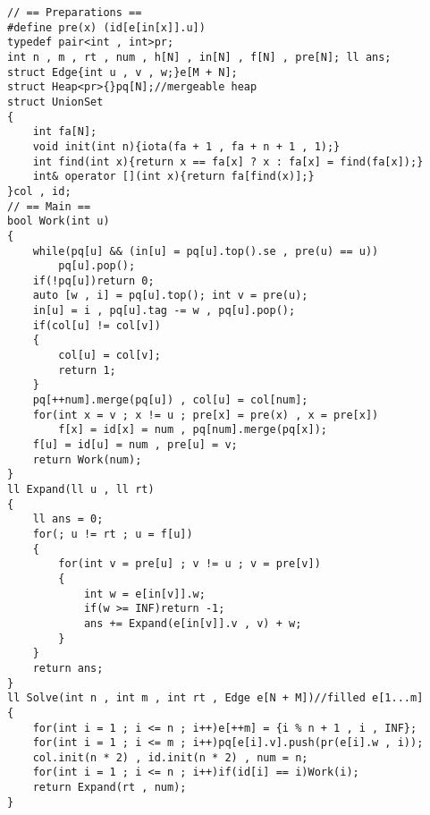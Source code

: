\begin{verbatim}
// == Preparations ==
#define pre(x) (id[e[in[x]].u])
typedef pair<int , int>pr;
int n , m , rt , num , h[N] , in[N] , f[N] , pre[N]; ll ans;
struct Edge{int u , v , w;}e[M + N];
struct Heap<pr>{}pq[N];//mergeable heap
struct UnionSet
{
    int fa[N];
    void init(int n){iota(fa + 1 , fa + n + 1 , 1);}
    int find(int x){return x == fa[x] ? x : fa[x] = find(fa[x]);}
    int& operator [](int x){return fa[find(x)];}
}col , id;
// == Main ==
bool Work(int u)
{
    while(pq[u] && (in[u] = pq[u].top().se , pre(u) == u))
        pq[u].pop();
    if(!pq[u])return 0;
    auto [w , i] = pq[u].top(); int v = pre(u);
    in[u] = i , pq[u].tag -= w , pq[u].pop();
    if(col[u] != col[v])
    {
        col[u] = col[v];
        return 1;
    }
    pq[++num].merge(pq[u]) , col[u] = col[num];
    for(int x = v ; x != u ; pre[x] = pre(x) , x = pre[x])
        f[x] = id[x] = num , pq[num].merge(pq[x]);
    f[u] = id[u] = num , pre[u] = v;
    return Work(num);
}
ll Expand(ll u , ll rt)
{
    ll ans = 0;
    for(; u != rt ; u = f[u])
    {
        for(int v = pre[u] ; v != u ; v = pre[v])
        {
            int w = e[in[v]].w;
            if(w >= INF)return -1;
            ans += Expand(e[in[v]].v , v) + w;
        }
    }
    return ans;
}
ll Solve(int n , int m , int rt , Edge e[N + M])//filled e[1...m]
{
    for(int i = 1 ; i <= n ; i++)e[++m] = {i % n + 1 , i , INF};
    for(int i = 1 ; i <= m ; i++)pq[e[i].v].push(pr(e[i].w , i));
    col.init(n * 2) , id.init(n * 2) , num = n;
    for(int i = 1 ; i <= n ; i++)if(id[i] == i)Work(i);
    return Expand(rt , num);
}
\end{verbatim}
